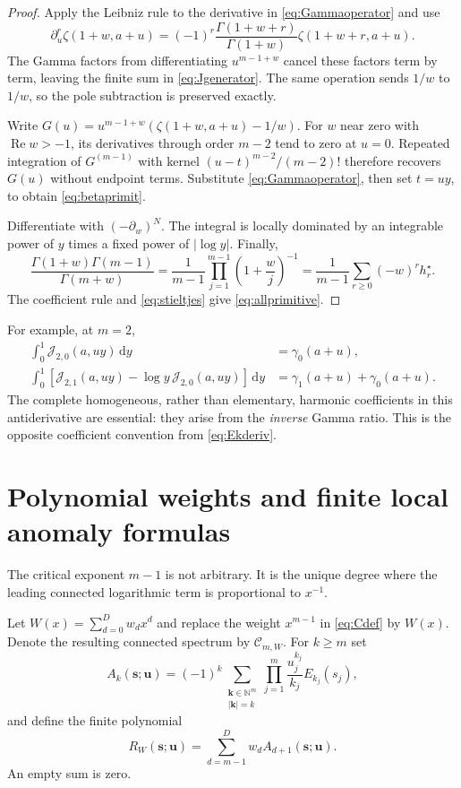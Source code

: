 \documentclass[11pt]{article}
\numberwithin{equation}{section}
\theoremstyle{definition}\newtheorem{definition}[theorem]{Definition}
\theoremstyle{remark}\newtheorem{remark}[theorem]{Remark}
\newcommand{\dd}{\,\mathrm d}
\newcommand{\N}{\mathbb N}
\newcommand{\Rea}{\operatorname{Re}}
\newcommand{\bs}{\boldsymbol{s}}
\newcommand{\bu}{\boldsymbol{u}}
\newcommand{\bk}{\boldsymbol{k}}
\newcommand{\cC}{\mathcal C}
\newcommand{\cJ}{\mathcal J}
\begin{document}
\begin{proof}
Apply the Leibniz rule to the derivative in \eqref{eq:Gammaoperator} and use
\[
 \partial_u^r\zeta(1+w,a+u)
 =(-1)^r\frac{\Gamma(1+w+r)}{\Gamma(1+w)}\zeta(1+w+r,a+u).
\]
The Gamma factors from differentiating $u^{m-1+w}$ cancel these factors term by term, leaving the finite sum in \eqref{eq:Jgenerator}. The same operation sends $1/w$ to $1/w$, so the pole subtraction is preserved exactly.

Write $G(u)=u^{m-1+w}(\zeta(1+w,a+u)-1/w)$. For $w$ near zero with $\Rea w>-1$, its derivatives through order $m-2$ tend to zero at $u=0$. Repeated integration of $G^{(m-1)}$ with kernel $(u-t)^{m-2}/(m-2)!$ therefore recovers $G(u)$ without endpoint terms. Substitute \eqref{eq:Gammaoperator}, then set $t=uy$, to obtain \eqref{eq:betaprimit}.

Differentiate with $(-\partial_w)^N$. The integral is locally dominated by an integrable power of $y$ times a fixed power of $|\log y|$. Finally,
\[
 \frac{\Gamma(1+w)\Gamma(m-1)}{\Gamma(m+w)}
 =\frac1{m-1}\prod_{j=1}^{m-1}\left(1+\frac wj\right)^{-1}
 =\frac1{m-1}\sum_{r\ge0}(-w)^r h_r^\star.
\]
The coefficient rule and \eqref{eq:stieltjes} give \eqref{eq:allprimitive}.
\end{proof}

For example, at $m=2$,
\begin{align}
 \int_0^1\cJ_{2,0}(a,uy)\dd y&=\gamma_0(a+u),\\
 \int_0^1\left[\cJ_{2,1}(a,uy)-\log y\,\cJ_{2,0}(a,uy)\right]\dd y
 &=\gamma_1(a+u)+\gamma_0(a+u).
\end{align}
The complete homogeneous, rather than elementary, harmonic coefficients in this antiderivative are essential: they arise from the \emph{inverse} Gamma ratio. This is the opposite coefficient convention from \eqref{eq:Ekderiv}.

\section{Polynomial weights and finite local anomaly formulas}
The critical exponent $m-1$ is not arbitrary. It is the unique degree where the leading connected logarithmic term is proportional to $x^{-1}$.

Let $W(x)=\sum_{d=0}^D w_dx^d$ and replace the weight $x^{m-1}$ in \eqref{eq:Cdef} by $W(x)$. Denote the resulting connected spectrum by $\cC_{m,W}$. For $k\ge m$ set
\begin{equation}\label{eq:Bkpoly}
 A_k(\bs;\bu)=(-1)^k\sum_{\substack{\bk\in\N^m\\|\bk|=k}}
                  \prod_{j=1}^m\frac{u_j^{k_j}}{k_j}E_{k_j}(s_j),
\end{equation}
and define the finite polynomial
\begin{equation}\label{eq:RW}
 R_W(\bs;\bu)=\sum_{d=m-1}^D w_d A_{d+1}(\bs;\bu).
\end{equation}
An empty sum is zero.
\end{document}
